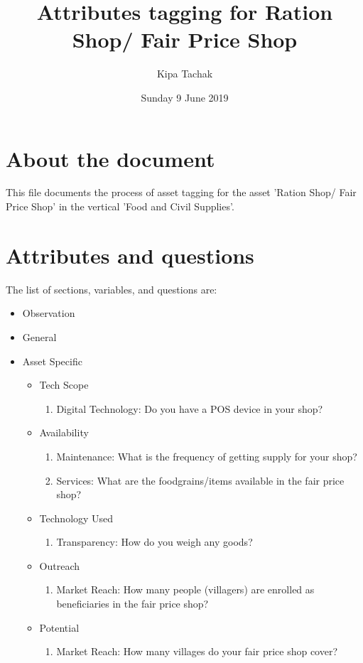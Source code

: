 \documentclass[oneside,twocolumn]{article}
\title{Attributes tagging for Ration Shop/ Fair Price Shop}
\author{Kipa Tachak}
\date{Sunday  9 June 2019}
\begin{document}
\maketitle

\section{About the document}
This file documents the process of asset tagging for the asset 'Ration Shop/ Fair Price Shop' in the
vertical 'Food and Civil Supplies'.

\section{Attributes and questions}
The list of sections, variables, and questions are:
    \begin{itemize}
    \item Observation
    \item General
    \item Asset Specific
    \begin{itemize}
\item Tech Scope
\begin{enumerate}
\item Digital Technology: Do you have a POS device in your shop?
\end{enumerate}

\item Availability
\begin{enumerate}
\item Maintenance: What is the frequency of getting supply for your shop?
\item Services: What are the foodgrains/items available in the fair price shop?
\end{enumerate}

\item Technology Used
\begin{enumerate}
\item Transparency: How do you weigh any goods?
\end{enumerate}

\item Outreach
\begin{enumerate}
\item Market Reach: How many people (villagers) are enrolled as beneficiaries in the fair price shop?
\end{enumerate}

\item Potential
\begin{enumerate}
\item Market Reach: How many villages do your fair price shop cover?
\end{enumerate}

\end{itemize}

    \end{itemize}
\end{document}
